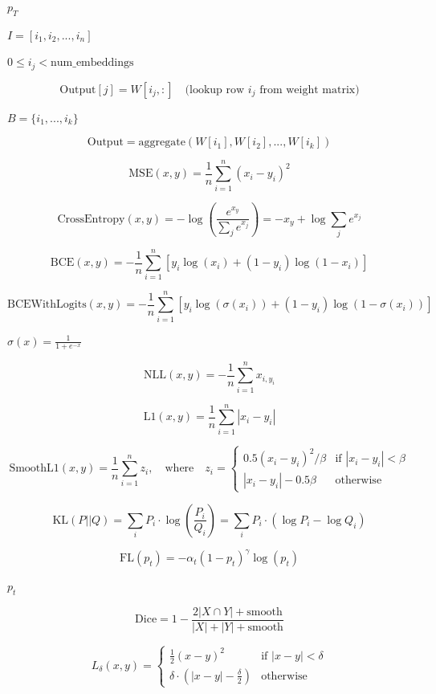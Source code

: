 \documentclass{article}
\begin{document}
$p_T$
\pagebreak

$I = [i_1, i_2, ..., i_n]$
\pagebreak

$0 \le i_j < \text{num\_embeddings}$
\pagebreak

\[   \text{Output}[j] = W[i_j, :] \quad \text{(lookup row } i_j \text{ from weight matrix)}
\]
\pagebreak

$B = \{i_1, ..., i_k\}$
\pagebreak

\[\text{Output} = \text{aggregate}(W[i_1], W[i_2], ..., W[i_k])
\]
\pagebreak

\[\text{MSE}(x, y) = \frac{1}{n}\sum_{i=1}^{n}(x_i - y_i)^2
\]
\pagebreak

\[\text{CrossEntropy}(x, y) = -\log\left(\frac{e^{x_y}}{\sum_j e^{x_j}}\right) = -x_y + \log\sum_j e^{x_j}
\]
\pagebreak

\[\text{BCE}(x, y) = -\frac{1}{n}\sum_{i=1}^{n}\left[y_i\log(x_i) + (1-y_i)\log(1-x_i)\right]
\]
\pagebreak

\[\text{BCEWithLogits}(x, y) = -\frac{1}{n}\sum_{i=1}^{n}\left[y_i\log(\sigma(x_i)) + (1-y_i)\log(1-\sigma(x_i))\right]
\]
\pagebreak

$\sigma(x) = \frac{1}{1+e^{-x}}$
\pagebreak

\[\text{NLL}(x, y) = -\frac{1}{n}\sum_{i=1}^{n} x_{i,y_i}
\]
\pagebreak

\[\text{L1}(x, y) = \frac{1}{n}\sum_{i=1}^{n}|x_i - y_i|
\]
\pagebreak

\[\text{SmoothL1}(x, y) = \frac{1}{n}\sum_{i=1}^{n} z_i, \quad \text{where} \quad
z_i = \begin{cases}
  0.5(x_i - y_i)^2 / \beta & \text{if } |x_i - y_i| < \beta \\
  |x_i - y_i| - 0.5\beta & \text{otherwise}
\end{cases}
\]
\pagebreak

\[\text{KL}(P||Q) = \sum_i P_i \cdot \log\left(\frac{P_i}{Q_i}\right) = \sum_i P_i \cdot (\log P_i - \log Q_i)
\]
\pagebreak

\[\text{FL}(p_t) = -\alpha_t (1 - p_t)^\gamma \log(p_t)
\]
\pagebreak

$p_t$
\pagebreak

\[\text{Dice} = 1 - \frac{2|X \cap Y| + \text{smooth}}{|X| + |Y| + \text{smooth}}
\]
\pagebreak

\[L_\delta(x, y) = \begin{cases}
  \frac{1}{2}(x - y)^2 & \text{if } |x - y| < \delta \\
  \delta \cdot (|x - y| - \frac{\delta}{2}) & \text{otherwise}
\end{cases}
\]
\pagebreak
\end{document}
